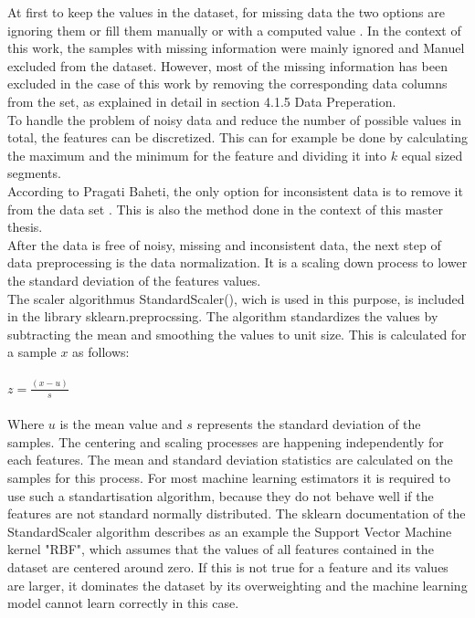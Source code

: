 \documentclass[../masterarbeit.tex]{subfiles}
\begin{document}
At first to keep the values in the dataset, for missing data the two options are ignoring them or fill them manually or with a computed value \textcite[]{Pragati_Preprocessing:2022} \textcite[]{kotsiantis2006data}. In the context of this work, the samples with missing information were mainly ignored and Manuel excluded from the dataset. However, most of the missing information has been excluded in the case of this work by removing the corresponding data columns from the set, as explained in detail in section 4.1.5 Data Preperation. \\
To handle the problem of noisy data and reduce the number of possible values in total, the features can be discretized. This can for example be done by calculating the maximum and the minimum for the feature and dividing it into \(k\) equal sized segments. \autocite[]{kotsiantis2006data} \\
According to Pragati Baheti, the only option for inconsistent data is to remove it from the data set \textcite[]{Pragati_Preprocessing:2022}. This is also the method done in the context of this master thesis. \\
After the data is free of noisy, missing and inconsistent data, the next step of data preprocessing is the data normalization. It is a scaling down process to lower the standard deviation of the features values. \autocite[]{kotsiantis2006data} \\
The scaler algorithmus StandardScaler(), wich is used in this purpose, is included in the library sklearn.preprocssing. The algorithm standardizes the values by subtracting the mean and smoothing the values to unit size. \autocite[]{Sklearn_StandardScaler:2022} This is calculated for a sample \(x\) as follows:
\\~\\
\(z = \frac{(x - u)}{s} \) \hfill \textcite[]{Sklearn_StandardScaler:2022} \\~\\
Where \(u\) is the mean value and \(s\) represents the standard deviation of the samples. The centering and scaling processes are happening independently for each features. The mean and standard deviation statistics are calculated on the samples  for this process. \autocite[]{Sklearn_StandardScaler:2022}
For most machine learning estimators it is required to use such a standartisation algorithm, because they do not behave well if the features are not standard normally distributed. \autocite[]{Sklearn_StandardScaler:2022}
The sklearn documentation of the StandardScaler algorithm describes as an example the Support Vector Machine kernel "RBF", which assumes that the values of all features contained in the dataset are centered around zero. If this is not true for a feature and its values are larger, it dominates the dataset by its overweighting and the machine learning model cannot learn correctly in this case. \autocite[]{Sklearn_StandardScaler:2022}
\end{document}
